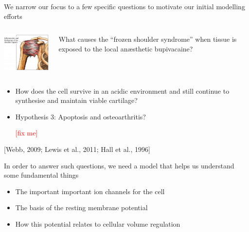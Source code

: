 \documentclass[ignorenonframetext]{beamer}
\newcommand{\references}[1] {
  \begin{flushright}
    \scriptsize [#1] \normalsize
  \end{flushright}
}
\newcommand{\fixme} {
  \scriptsize
  \textcolor{red}{[fix me]}
  \normalsize
}
\begin{document}
\begin{frame}{We narrow our focus to a few specific questions to
    motivate our initial modelling efforts}

  \begin{columns}
    \begin{column}{4.5cm}
      \begin{center}
        \includegraphics[width=4cm]{../images/pdf/frozen-shoulder}
      \end{center}
    \end{column}
    \begin{column}{6cm}
      What causes the ``frozen shoulder syndrome''
      when tissue is exposed to the local an\ae{}sthetic
      bupivacaine?
    \end{column}
  \end{columns}

  \vspace{0.5cm}

  \begin{itemize}
    \pause
  \item<2-> How does the cell survive in an acidic environment and
    still continue to synthesise and maintain viable cartilage?
  \item<2-> Hypothesis 3: Apoptosis and osteoarthritis?
    \fixme
  \end{itemize}
  \references{Webb, 2009; Lewis et al., 2011; Hall et al., 1996}

\end{frame}

\begin{frame}{In order to answer such questions, we need a model that
    helps us understand some fundamental things}
  \begin{itemize}
  \item The important important ion channels for the cell\\[0.5cm]
  \item The basis of the resting membrane potential\\[0.5cm]
  \item How this potential relates to cellular volume regulation\\[0.5cm]
  \end{itemize}
\end{frame}
\end{document}
